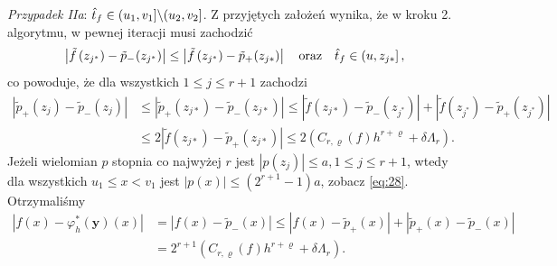 \documentclass[oik, pdftex, man]{mgrwms}
\begin{document}
    \textit{Przypadek IIa}: $\hat{t}_{f} \in (u_{1}, v_{1}] \backslash (u_{2}, v_{2}]$.
    Z przyjętych założeń wynika, że w kroku 2. algorytmu, w pewnej iteracji musi zachodzić
    \begin{equation*}
        \left|\tilde{f}\left(z_{j^{*}}\right)-\tilde{p}_{-\!}\left(z_{j^{*}}\right)\right| \leq\left|\tilde{f}\left(z_{j^{*}}\right)-\tilde{p}_{+\!}\left(z_{j *}\right)\right| \quad \text{oraz} \quad \hat{t}_{f} \in\left(u, z_{j *}\right],
    \end{equation*}
    co powoduje, że dla wszystkich $1 \leq j \leq r+1$ zachodzi
    \begin{equation*}
        \begin{aligned}
            \left|\tilde{p}_{+}\left(z_{j}\right)-\tilde{p}_{-}\left(z_{j}\right)\right| & 
            \leq\left|\tilde{p}_{+}\left(z_{j *}\right)-\tilde{p}_{-}\left(z_{j *}\right)\right| \leq\left|\tilde{f}\left(z_{j *}\right)-\tilde{p}_{-}\left(z_{j^{*}}\right)\right|+\left|\tilde{f}\left(z_{j^{*}}\right)-\tilde{p}_{+}\left(z_{j^{*}}\right)\right| \\
            & \leq 2\left|\tilde{f}\left(z_{j *}\right)-\tilde{p}_{+}\left(z_{j *}\right)\right| \leq 2\left(C_{r, \varrho}(f) h^{r+\varrho}+\delta \Lambda_{r}\right).
        \end{aligned}
    \end{equation*}
    Jeżeli wielomian $p$ stopnia co najwyżej $r$ jest $\left|p\left(z_{j}\right)\right| \leq a, 1 \leq j \leq r+1$, wtedy dla wszystkich $u_{1} \leq x<v_{1}$ jest $|p(x)| \leq\left(2^{r+1}-1\right) a$, zobacz \eqref{eq:28}. Otrzymaliśmy
    \begin{equation*}
        \begin{aligned}
            \left|f(x)-\varphi_{h}^{*}(\mathbf{y})(x)\right| &=\left|f(x)-\tilde{p}_{-}(x)\right| \leq\left|f(x)-\tilde{p}_{+}(x)\right|+\left|\tilde{p}_{+}(x)-\tilde{p}_{-}(x)\right| \\
            &=2^{r+1}\left(C_{r, \varrho}(f) h^{r+\varrho}+\delta \Lambda_{r}\right).
        \end{aligned}
    \end{equation*}
\end{document}
